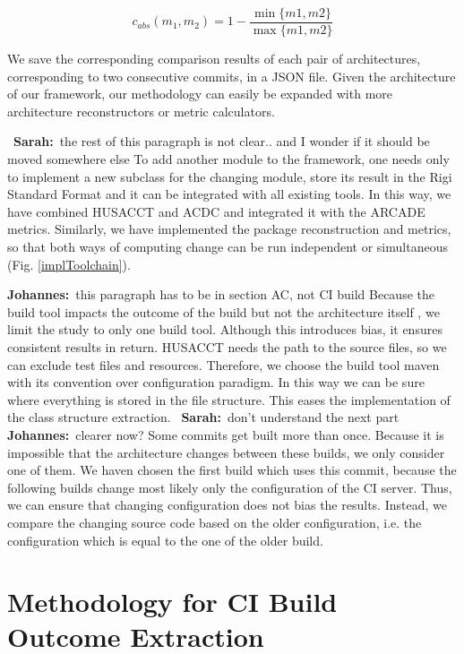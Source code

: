 \documentclass[sigplan, anonymous, review]{acmart}
\newcommand{\sn}[1]{{\color{blue}\textbf{Sarah:}~#1}}
\newcommand{\jk}[1]{{\color{violet}\textbf{Johannes:}~#1}}
\begin{document}
\begin{equation} \label{eq:absDiff}
	c_{abs}(m_1, m_2) = 1 - \frac{\min\{m1, m2\}}{\max\{m1, m2\}}
\end{equation} 


We save the corresponding comparison results of each pair of architectures, corresponding to two consecutive commits, in a JSON file. Given the architecture of our framework, our methodology can easily be expanded with more architecture reconstructors or metric calculators. 

~\sn{the rest of this paragraph is not clear.. and I wonder if it should be moved somewhere else} 
To add another module to the framework, one needs only to implement a new subclass for the changing module, store its result in the Rigi Standard Format and it can be integrated with all existing tools. 
In this way, we have combined HUSACCT and ACDC and integrated it with the ARCADE metrics. Similarly, we have implemented the package reconstruction and metrics, so that both ways of computing change can be run independent or simultaneous (Fig. \ref{implToolchain}).

\jk{this paragraph has to be in section AC, not CI build}
Because the build tool impacts the outcome of the build but not the architecture itself \cite{FailsCorr}, we limit the study to only one build tool. Although this introduces bias, it ensures consistent results in return. HUSACCT needs the path to the source files, so we can exclude test files and resources. Therefore, we choose the build tool maven with its convention over configuration paradigm. In this way we can be sure where everything is stored in the file structure. This eases the implementation of the class structure extraction. ~\sn{don't understand the next part} \jk{clearer now?}
Some commits get built more than once. Because it is impossible that the architecture changes between these builds, we only consider one of them. 
We haven chosen the first build which uses this commit, because the following builds change most likely only the configuration of the CI server. 
Thus, we can ensure that changing configuration does not bias the results. Instead, we compare the changing source code based on the older configuration, i.e. the configuration which is equal to the one of the older build. 

\section{Methodology for CI Build Outcome Extraction}
\label{sec:ci-build-outcome}
\end{document}
